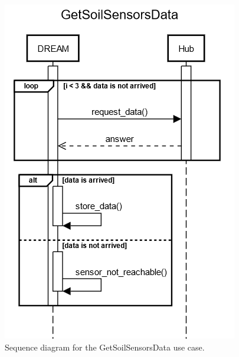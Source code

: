 \documentclass{article}
\begin{document}
\begin{figure}[H]
    \centering
    \includegraphics[scale=0.75]{sequence_diagrams/GetSoilSensorsData}
    \caption{Sequence diagram for the GetSoilSensorsData use case.}
\end{figure}
\newpage

\end{document}
